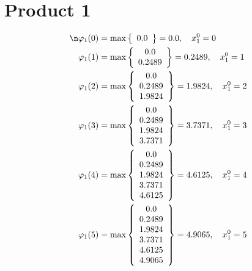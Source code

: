 \documentclass{article}
\begin{document}
\section{Product 1}
\begin{align*}
\n  
  
\varphi_{1}(0) &= \max \left\{ \begin{array}{c}
0.0
\end{array} \right\}=0.0,\quad x_{1}^0=0\\
  
  
  
  
\varphi_{1}(1) &= \max \left\{ \begin{array}{c}
0.0 \\
 0.2489
\end{array} \right\}=0.2489,\quad x_{1}^0=1\\
  
  
  
  
\varphi_{1}(2) &= \max \left\{ \begin{array}{c}
0.0 \\
 0.2489 \\
 1.9824
\end{array} \right\}=1.9824,\quad x_{1}^0=2\\
  
  
  
  
\varphi_{1}(3) &= \max \left\{ \begin{array}{c}
0.0 \\
 0.2489 \\
 1.9824 \\
 3.7371
\end{array} \right\}=3.7371,\quad x_{1}^0=3\\
  
  
  
  
\varphi_{1}(4) &= \max \left\{ \begin{array}{c}
0.0 \\
 0.2489 \\
 1.9824 \\
 3.7371 \\
 4.6125
\end{array} \right\}=4.6125,\quad x_{1}^0=4\\
  
  
  
  
\varphi_{1}(5) &= \max \left\{ \begin{array}{c}
0.0 \\
 0.2489 \\
 1.9824 \\
 3.7371 \\
 4.6125 \\
 4.9065
\end{array} \right\}=4.9065,\quad x_{1}^0=5\\
  

\end{align*}
\end{document}
